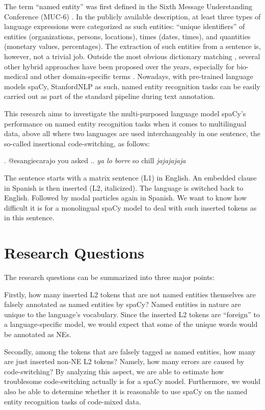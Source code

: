 \documentclass[11pt]{article}
\begin{document}
The term ``named entity'' was first defined in the Sixth Message Understanding Conference (MUC-6) \citep{grishman1996ner}. In the publicly available description, at least three types of language expressions were categorized as such entities: ``unique identifiers'' of entities (organizations, persons, locations), times (dates, times), and quantities (monetary values, percentages). The extraction of such entities from a sentence is, however, not a trivial job. Outside the most obvious dictionary matching \citep{higashinaka2012nerwiki,shang2018learning}, several other hybrid approaches have been proposed over the years, especially for bio-medical and other domain-specific terms \citep{rock2012nerbio,lou2020dicthyb}. Nowadays, with pre-trained language models spaCy, StanfordNLP as such, named entity recognition tasks can be easily carried out as part of the standard pipeline during text annotation.

This research aims to investigate the multi-purposed language model spaCy's performance on named entity recognition tasks when it comes to multilingual data, above all where two languages are used interchangeably in one sentence, the so-called insertional code-switching, as follows:

\ex. @esangiecarajo you asked .. \textit{ya lo borre} so chill \textit{jajajajaja}

The sentence starts with a matrix sentence (L1) in English. An embedded clause in Spanish is then inserted (L2, italicized). The language is switched back to English. Followed by modal particles again in Spanish. We want to know how difficult it is for a monolingual spaCy model to deal with such inserted tokens as in this sentence.


\section{Research Questions}

The research questions can be summarized into three major points:

Firstly, how many inserted L2 tokens that are not named entities themselves are falsely annotated as named entities by spaCy? Named entities in nature are unique to the language's vocabulary. Since the inserted L2 tokens are ``foreign'' to a language-specific model, we would expect that some of the unique words would be annotated as NEs.

Secondly, among the tokens that are falsely tagged as named entities, how many are just inserted non-NE L2 tokens? Namely, how many errors are caused by code-switching? By analyzing this aspect, we are able to estimate how troublesome code-switching actually is for a spaCy model. Furthermore, we would also be able to determine whether it is reasonable to use spaCy on the named entity recognition tasks of code-mixed data.
\end{document}
